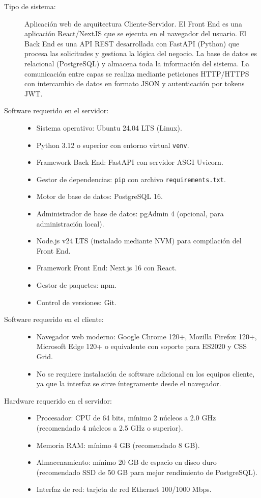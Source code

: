 \begin{description}
	
	\item[Tipo de sistema:] Aplicación web de arquitectura Cliente-Servidor. 
	El Front End es una aplicación React/NextJS que se ejecuta en el navegador 
	del usuario. El Back End es una API REST desarrollada con FastAPI (Python) 
	que procesa las solicitudes y gestiona la lógica del negocio. La base de 
	datos es relacional (PostgreSQL) y almacena toda la información del sistema. 
	La comunicación entre capas se realiza mediante peticiones HTTP/HTTPS con 
	intercambio de datos en formato JSON y autenticación por tokens JWT.
	
	\item[Software requerido en el servidor:] 
	\begin{itemize}
		\item Sistema operativo: Ubuntu 24.04 LTS (Linux).
		\item Python 3.12 o superior con entorno virtual \texttt{venv}.
		\item Framework Back End: FastAPI con servidor ASGI Uvicorn.
		\item Gestor de dependencias: \texttt{pip} con archivo 
		\texttt{requirements.txt}.
		\item Motor de base de datos: PostgreSQL 16.
		\item Administrador de base de datos: pgAdmin 4 (opcional, para 
		administración local).
		\item Node.js v24 LTS (instalado mediante NVM) para compilación 
		del Front End.
		\item Framework Front End: Next.js 16 con React.
		\item Gestor de paquetes: npm.
		\item Control de versiones: Git.
	\end{itemize}
	
	\item[Software requerido en el cliente:] 
	\begin{itemize}
		\item Navegador web moderno: Google Chrome 120+, Mozilla Firefox 
		120+, Microsoft Edge 120+ o equivalente con soporte para ES2020 
		y CSS Grid.
		\item No se requiere instalación de software adicional en los 
		equipos cliente, ya que la interfaz se sirve íntegramente desde 
		el navegador.
	\end{itemize}
	
	\item[Hardware requerido en el servidor:]
	\begin{itemize}
		\item Procesador: CPU de 64 bits, mínimo 2 núcleos a 2.0 GHz 
		(recomendado 4 núcleos a 2.5 GHz o superior).
		\item Memoria RAM: mínimo 4 GB (recomendado 8 GB).
		\item Almacenamiento: mínimo 20 GB de espacio en disco duro 
		(recomendado SSD de 50 GB para mejor rendimiento de PostgreSQL).
		\item Interfaz de red: tarjeta de red Ethernet 100/1000 Mbps.
	\end{itemize}
	

\end{description}
